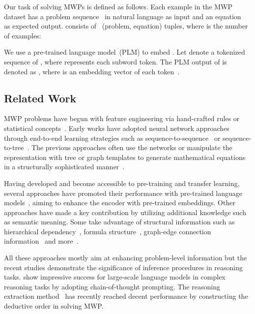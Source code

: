 \documentclass[11pt]{article}
\newcommand{\1}{\mathbb{1}}
\begin{document}
Our task of solving MWPs is defined as follows.
Each example in the MWP dataset  has a problem sequence~ in natural language as input and an equation~ as expected output.
 consists of ~(problem, equation) tuples, where  is the number of examples:

We use a pre-trained language model~(PLM) to embed .
Let  denote a tokenized sequence of ,
where  represents each subword token.
The PLM output of  is denoted as , where  is an embedding vector of each token~.

\subsection{Related Work}



MWP problems have begun with feature engineering via hand-crafted rules or statistical concepts~\citep{bakman-etal-2007-robust, hosseini-etal-2014-learning, mitra-baral-2016-learning}.
Early works have adopted neural network approaches through end-to-end learning strategies such as sequence-to-sequence~\citep{ling-etal-2017-program, wang-etal-2018-translating, li-etal-2019-modeling} or sequence-to-tree~\citep{xie-sun-2019-goal, liu-etal-2019-tree, chiang-chen-2019-semantically, qin-etal-2020-semantically}. The previous approaches often 
use the networks or manipulate the representation with tree or graph templates to generate mathematical equations in a structurally sophisticated manner~\cite{wang-etal-2017-deep, zhang-etal-2020-graph-tree}.

Having developed and become accessible to pre-training and transfer learning, several approaches have promoted their performance with pre-trained language models~\citep{shen-etal-2021-generate-rank, yu-etal-2021-improving, huang-etal-2021-disenqnet, zhang-etal-2020-teacher, liang-etal-2022-mwp}, aiming to enhance the encoder with pre-trained embeddings.
Other approaches have made a key contribution by utilizing additional knowledge such as semantic meaning. Some take advantage of structural information such as hierarchical dependency~\citep{shen-jin-2020-solving,lin-etal-2021-hms,yu-etal-2021-improving}, formula structure~\citep{huang-etal-2020-neural}, graph-edge connection information~\citep{zhang-etal-2020-graph-tree,wu-etal-2021-edge-enhanced, li-etal-2020-graph-tree} and more~\citep{li-etal-2022-seeking, shen-etal-2021-generate-rank}.

All these approaches mostly aim at enhancing problem-level information but the recent studies demonstrate the significance of inference procedures in reasoning tasks.
\citet{wei-etal-2022-chain} show impressive success for large-scale language models in complex reasoning tasks by adopting chain-of-thought prompting.
The reasoning extraction method~\citep{jie-etal-2022-learning} has recently reached decent performance by constructing the deductive order in solving MWP.
\end{document}
